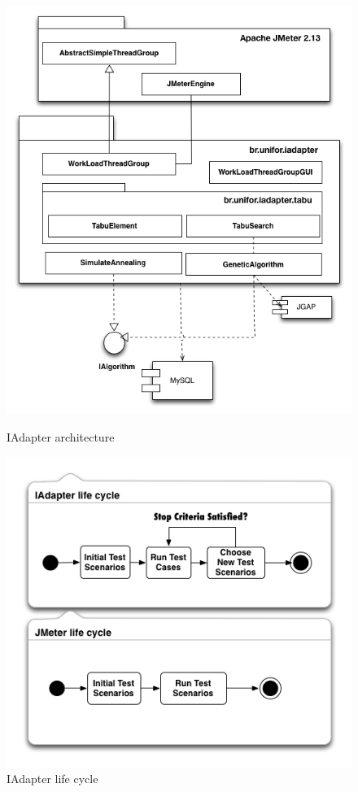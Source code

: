 \documentclass{bmcart}
\begin{document}
\begin{backmatter}
\begin{figure}[h]
\begin{minipage}{.5\textwidth}
\center
\includegraphics{./images/iadapter1.png}
\caption{IAdapter architecture}
\label{fig:iadapterarchitecture}
\end{minipage}
\begin{minipage}{.5\textwidth}
\centering
\includegraphics{./images/lifecycle2.png}
\caption{IAdapter life cycle}
\label{fig:iadapterlifecycle}
\end{minipage}
\end{figure}




\end{backmatter}
\end{document}
